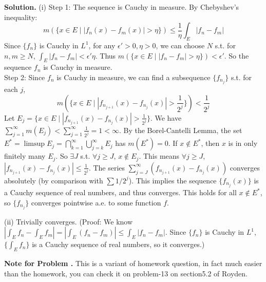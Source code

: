 \documentclass[12pt, a4paper, oneside]{article}
\newcounter{problemname}
\newenvironment{solution}
  {\par\noindent\textbf{Solution. }\newline}
  {\par}
\newenvironment{note}
  {\par\noindent\textbf{Note for Problem \arabic{problemname}.
}\newline}
  {\par}
\begin{document}
\begin{solution}
(i)
Step 1: The sequence is Cauchy in measure.
By Chebyshev's inequality:
$$ m(\{x \in E \mid |f_n(x) - f_m(x)| > \eta\}) \le \frac{1}{\eta} \int_E |f_n - f_m|
$$
Since $\{f_n\}$ is Cauchy in $L^1$, for any $\epsilon' > 0, \eta > 0$, we can choose $N$ s.t.
for $n,m \ge N$, $\int_E |f_n - f_m| < \epsilon' \eta$.
Thus $m(\{x \in E \mid |f_n - f_m| > \eta\}) < \epsilon'$.
So the sequence $f_n$ is Cauchy in measure.\\
\noindent Step 2:
Since $f_n$ is Cauchy in measure, we can find a subsequence $\{f_{n_j}\}$ s.t.
for each $j$,
$$ m(\{x \in E \mid |f_{n_{j+1}}(x) - f_{n_j}(x)| > \frac{1}{2^j}\}) < \frac{1}{2^j} $$
Let $E_j = \{x \in E \mid |f_{n_{j+1}}(x) - f_{n_j}(x)|
> \frac{1}{2^j}\}$.
We have $\sum_{j=1}^\infty m(E_j) < \sum_{j=1}^\infty \frac{1}{2^j} = 1 < \infty$.
By the Borel-Cantelli Lemma, the set $E^* = \limsup E_j = \bigcap_{k=1}^\infty \bigcup_{j=k}^\infty E_j$ has $m(E^*) = 0$.
If $x \notin E^*$, then $x$ is in only finitely many $E_j$. So $\exists J$ s.t.
$\forall j \ge J$, $x \notin E_j$.
This means $\forall j \ge J$, $|f_{n_{j+1}}(x) - f_{n_j}(x)| \le \frac{1}{2^j}$.
The series $\sum_{j=J}^\infty (f_{n_{j+1}}(x) - f_{n_j}(x))$ converges absolutely (by comparison with $\sum 1/2^j$).
This implies the sequence $\{f_{n_j}(x)\}$ is a Cauchy sequence of real numbers, and thus converges.
This holds for all $x \notin E^*$, so $\{f_{n_j}\}$ converges pointwise a.e. to some function $f$.

(ii) Trivially converges.
(Proof: We know $| \int_E f_n - \int_E f_m | = | \int_E (f_n - f_m) | \le \int_E |f_n - f_m|$. Since $\{f_n\}$ is Cauchy in $L^1$, $\{\int_E f_n\}$ is a Cauchy sequence of real numbers, so it converges.)
\end{solution}

\begin{note}
This is a variant of homework question, in fact much easier than the homework, you can check it on problem-13 on section5.2 of Royden.
\end{note}
\end{document}

